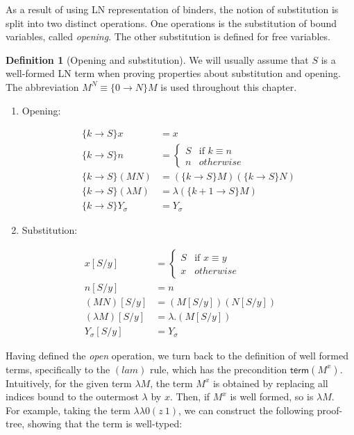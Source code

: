 \documentclass[a4paper, 12pt, twoside]{style/ociamthesis}
\theoremstyle{plain}
\theoremstyle{definition}
\newtheorem{Definition}{Definition}[chapter]
\theoremstyle{remark}
\providecommand{\tightlist}{%
  \setlength{\itemsep}{0pt}\setlength{\parskip}{0pt}}
\newcommand{\trm}{\textsf{term}}
\begin{document}
As a result of using LN representation of binders, the notion of
substitution is split into two distinct operations. One operations is
the substitution of bound variables, called \emph{opening}. The other
substitution is defined for free variables.

\begin{Definition}[Opening and substitution]

We will usually assume that \(S\) is a well-formed LN term when proving
properties about substitution and opening. The abbreviation
\(M^N \equiv \{0 \to N\}M\) is used throughout this chapter.

\begin{enumerate}
\def\labelenumi{\roman{enumi})}
\tightlist
\item
  Opening:

  \begin{align*}
  \{k \to S\}x &= x\\
  \{k \to S\}n &= \begin{cases}
  S & \text{if }k \equiv n\\
  n & otherwise
  \end{cases}\\
  \{k \to S\}(MN) &= (\{k \to S\}M)(\{k \to S\}N)\\
  \{k \to S\}(\lambda M) &= \lambda (\{k+1 \to S\}M)\\
  \{k \to S\}Y_\sigma &= Y_\sigma
  \end{align*}
\item
  Substitution:
\end{enumerate}

\begin{align*} 
x[S/y] &= \begin{cases}
S & \text{if }x \equiv y\\
x & otherwise
\end{cases}\\
n[S/y] &= n \\
(MN)[S/y] &= (M[S/y])(N[S/y])\\
(\lambda M)[S/y] &= \lambda. (M[S/y])\\
Y_\sigma[S/y] &= Y_\sigma
\end{align*}

\end{Definition}

Having defined the \emph{open} operation, we turn back to the definition
of well formed terms, specifically to the \((lam)\) rule, which has the
precondition \(\trm (M^x)\). Intuitively, for the given term
\(\lambda M\), the term \(M^x\) is obtained by replacing all indices
bound to the outermost \(\lambda\) by \(x\). Then, if \(M^x\) is well
formed, so is \(\lambda M\).\\
For example, taking the term \(\lambda\lambda 0(z\ 1)\), we can
construct the following proof-tree, showing that the term is well-typed:
\end{document}

